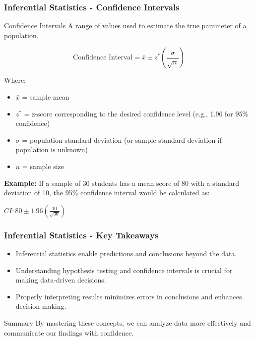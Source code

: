 \documentclass[aspectratio=169]{beamer}
\begin{document}
\begin{frame}[fragile]
    \frametitle{Inferential Statistics - Confidence Intervals}
    \begin{block}{Confidence Intervals}
        A range of values used to estimate the true parameter of a population.
        
        \begin{equation}
        \text{Confidence Interval} = \bar{x} \pm z^* \left(\frac{\sigma}{\sqrt{n}}\right)
        \end{equation}

        Where:
        \begin{itemize}
            \item $\bar{x}$ = sample mean  
            \item $z^*$ = z-score corresponding to the desired confidence level (e.g., 1.96 for 95\% confidence)  
            \item $\sigma$ = population standard deviation (or sample standard deviation if population is unknown)  
            \item $n$ = sample size  
        \end{itemize}
        
        \textbf{Example:} If a sample of 30 students has a mean score of 80 with a standard deviation of 10, the 95\% confidence interval would be calculated as:
        
        \( CI: 80 \pm 1.96 \left(\frac{10}{\sqrt{30}}\right) \)
    \end{block}
\end{frame}

\begin{frame}[fragile]
    \frametitle{Inferential Statistics - Key Takeaways}
    \begin{itemize}
        \item Inferential statistics enable predictions and conclusions beyond the data.
        \item Understanding hypothesis testing and confidence intervals is crucial for making data-driven decisions.
        \item Properly interpreting results minimizes errors in conclusions and enhances decision-making.
    \end{itemize}

    \begin{block}{Summary}
        By mastering these concepts, we can analyze data more effectively and communicate our findings with confidence.
    \end{block}
\end{frame}
\end{document}
